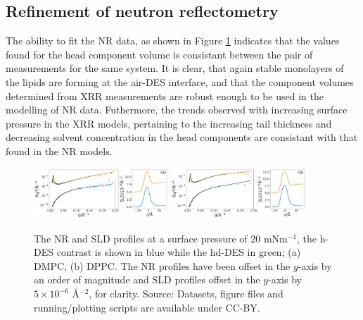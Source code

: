 \documentclass[twoside,twocolumn,9pt]{article}
\begin{document}
\subsection{Refinement of neutron reflectometry}
The ability to fit the NR data, as shown in Figure \ref{fig:neutron} indicates that the values found for the head component volume is consistant between the pair of measurements for the same system. It is clear, that again stable monolayers of the lipids are forming at the air-DES interface, and that the component volumes determined from XRR measurements are robust enough to be used in the modelling of NR data. Futhermore, the trends observed with increasing surface pressure in the XRR models, pertaining to the increasing tail thickness and decreasing solvent concentration in the head components are consistant with that found in the NR models.
%
\begin{figure}
	\centering
	\includegraphics[width=0.45\textwidth]{figures/nDMPC20_all_data}
	\includegraphics[width=0.45\textwidth]{figures/nDPPC20_all_data}
	\caption{The NR and SLD profiles at a surface pressure of 20 mNm$^{-1}$, the h-DES contrast is shown in blue while the hd-DES in green; (a) DMPC, (b) DPPC. The NR profiles have been offset in the $y$-axis by an order of magnitude and SLD profiles offset in the $y$-axis by $5\times10^{-6}$ \AA$^{-2}$, for clarity. Source: Datasets, figure files and running/plotting scripts are available under CC-BY.\cite{mccluskey_2018}}
	\label{fig:neutron}
\end{figure}
%
\end{document}
